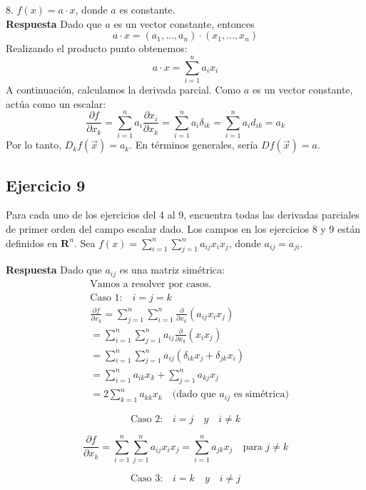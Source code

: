 \documentclass{report}
\begin{document}
    8. $f(x) = a \cdot x$, donde $a$ es constante.
    \\
    \textbf{Respuesta}
    Dado que $a$ es un vector constante, entonces
    $$
    a \cdot x = (a_1, \ldots, a_n) \cdot (x_1, \ldots, x_n)
    $$
    Realizando el producto punto obtenemos:
    $$
    a \cdot x = \sum_{i=1}^n a_i x_i
    $$
    A continuación, calculamos la derivada parcial. Como $a$ es un vector constante, actúa como un escalar:
    $$
    \frac{\partial f}{\partial x_k} = \sum_{i=1}^n a_i \frac{\partial x_i}{\partial x_k} = \sum_{i=1}^n a_i \delta_{ik} = \sum_{i=1}^n a_i d_{ik} = a_k
    $$
    Por lo tanto, $D_k f(\vec{x}) = a_k$. En términos generales, sería $Df(\vec{x}) = a$.\subsection*{Ejercicio 9}
    Para cada uno de los ejercicios del 4 al 9, encuentra todas las derivadas parciales de primer orden del campo escalar dado. Los campos en los ejercicios 8 y 9 están definidos en $\mathbf{R}^{n}$.
    Sea $f(x)=\sum_{i=1}^{n} \sum_{j=1}^{n} a_{i j} x_{i} x_{j}$, donde $a_{i j}=a_{j i}$.

    \textbf{Respuesta}
    Dado que $a_{ij}$ es una matriz simétrica:
    \[
    \begin{aligned}
    & \text{Vamos a resolver por casos.} \\
    & \text{Caso 1:} \quad i = j = k \\
    & \frac{\partial f}{\partial x_k} = \sum_{j=1}^n \sum_{i=1}^n \frac{\partial}{\partial x_k} \left(a_{ij} x_i x_j\right) \\
    & = \sum_{i=1}^n \sum_{j=1}^n a_{ij} \frac{\partial}{\partial x_k} \left(x_i x_j\right) \\
    & = \sum_{i=1}^n \sum_{j=1}^n a_{ij} \left(\delta_{ik} x_j + \delta_{jk} x_i\right) \\
    & = \sum_{i=1}^n a_{ik} x_k + \sum_{j=1}^n a_{kj} x_j \\
    & = 2 \sum_{k=1}^n a_{kk} x_k \quad \text{(dado que } a_{ij} \text{ es simétrica)}
    \end{aligned}
    \]

    \[
    \text{Caso 2:} \quad i = j \quad y \quad i \neq k
    \]

    \[
    \frac{\partial f}{\partial x_k} = \sum_{i=1}^n \sum_{j=1}^n a_{ij} x_i x_j
    = \sum_{i=1}^n a_{jk} x_j \quad \text{para } j \neq k
    \]

    \[
    \text{Caso 3:} \quad i = k \quad y \quad i \neq j
    \]
\end{document}
